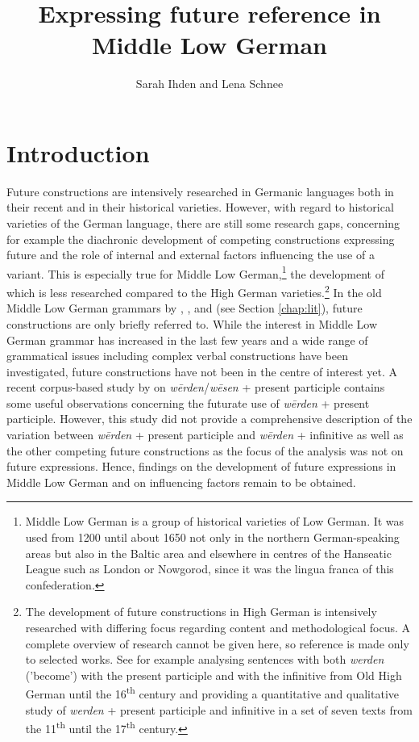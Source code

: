 \documentclass[output=paper,colorlinks,citecolor=brown]{langscibook}
\author{Sarah Ihden\orcid{}\affiliation{Universität Rostock} and Lena Schnee\orcid{}\affiliation{Universität Hamburg}}
\title{Expressing future reference in Middle Low German}
\begin{document}
\maketitle

\section{Introduction}
Future constructions are intensively researched in Germanic languages both in their recent and in their historical varieties. However, with regard to historical varieties of the German language, there are still some research gaps, concerning for example the diachronic development of competing constructions expressing future and the role of internal and external factors influencing the use of a variant. This is especially true for Middle Low German,\footnote{Middle Low German is a group of historical varieties of Low German. It was used from 1200 until about 1650 not only in the northern German-speaking areas but also in the Baltic area and elsewhere in centres of the Hanseatic League such as London or Nowgorod, since it was the lingua franca of this confederation.} the development of which is less researched compared to the High German varieties.\footnote{The development of future constructions in High German is intensively researched with differing focus regarding content and methodological focus. A complete overview of research cannot be given here, so reference is made only to selected works. See for example \citet{Saltveit1962} analysing sentences with both \textit{werden} ('become') with the present participle and with the infinitive from Old High German until the 16\textsuperscript{th} century and \citet{Oubouzar1974} providing a quantitative and qualitative study of \textit{werden} + present participle and infinitive in a set of seven texts from the 11\textsuperscript{th} until the 17\textsuperscript{th} century.} In the old Middle Low German grammars by \citet{Lübben1882}, \citet{Lasch1914}, and \citet{Sarauw1924} (see Section \ref{chap:lit}), future constructions are only briefly referred to. While the interest in Middle Low German grammar has increased in the last few years and a wide range of grammatical issues including complex verbal constructions have been investigated, future constructions have not been in the centre of interest yet. A recent corpus-based study by \citet{Ihden2023} on \textit{wērden}/\textit{wēsen} + present participle contains some useful observations concerning the futurate use of \textit{wērden} + present participle. However, this study did not provide a comprehensive description of the variation between \textit{wērden} + present participle and \textit{wērden} + infinitive as well as the other competing future constructions as the focus of the analysis was not on future expressions.
Hence, findings on the development of future expressions in Middle Low German and on influencing factors remain to be obtained.
\end{document}
